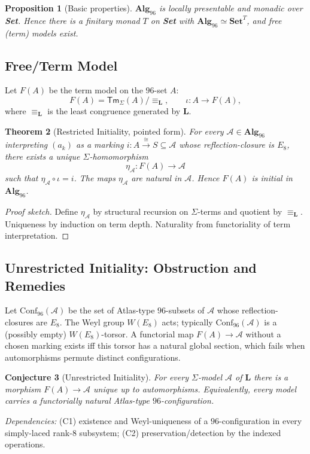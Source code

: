 \documentclass[12pt]{article}
\newtheorem{theorem}{Theorem}
\newtheorem{conjecture}[theorem]{Conjecture}
\newtheorem{proposition}[theorem]{Proposition}
\begin{document}
\begin{proposition}[Basic properties]
$\mathbf{Alg}_{96}$ is locally presentable and monadic over \textbf{Set}. Hence there is a finitary monad $T$ on \textbf{Set} with $\mathbf{Alg}_{96}\simeq \mathbf{Set}^T$, and free (term) models exist.
\end{proposition}

\subsection{Free/Term Model}
Let $F(A)$ be the term model on the $96$-set $A$:
\[
F(A)=\mathsf{Tm}_\Sigma(A)/{\equiv_{\mathbf L}},\qquad \iota:A\to F(A),
\]
where $\equiv_{\mathbf L}$ is the least congruence generated by $\mathbf L$.

\begin{theorem}[Restricted Initiality, pointed form]\label{thm:restricted-initiality}
For every $\mathcal A\in \mathbf{Alg}_{96}$ interpreting $(a_k)$ as a marking $i:A\xrightarrow{\cong} S\subseteq \mathcal A$ whose reflection-closure is $E_8$, there exists a unique $\Sigma$-homomorphism
\[
\eta_{\mathcal A}:F(A)\to \mathcal A
\]
such that $\eta_{\mathcal A}\circ\iota=i$. The maps $\eta_{\mathcal A}$ are natural in $\mathcal A$. Hence $F(A)$ is initial in $\mathbf{Alg}_{96}$.
\end{theorem}
\begin{proof}[Proof sketch]
Define $\eta_{\mathcal A}$ by structural recursion on $\Sigma$-terms and quotient by $\equiv_{\mathbf L}$. Uniqueness by induction on term depth. Naturality from functoriality of term interpretation.
\end{proof}

\subsection{Unrestricted Initiality: Obstruction and Remedies}
Let $\mathrm{Conf}_{96}(\mathcal A)$ be the set of Atlas-type $96$-subsets of $\mathcal A$ whose reflection-closures are $E_8$. The Weyl group $W(E_8)$ acts; typically $\mathrm{Conf}_{96}(\mathcal A)$ is a (possibly empty) $W(E_8)$-torsor. A functorial map $F(A)\to\mathcal A$ without a chosen marking exists iff this torsor has a natural global section, which fails when automorphisms permute distinct configurations.

\begin{conjecture}[Unrestricted Initiality]
For every $\Sigma$-model $\mathcal A$ of $\mathbf L$ there is a morphism $F(A)\to\mathcal A$ unique up to automorphisms. Equivalently, every model carries a functorially natural Atlas-type $96$-configuration.
\end{conjecture}
\noindent\emph{Dependencies:} (C1) existence and Weyl-uniqueness of a $96$-configuration in every simply-laced rank-$8$ subsystem; (C2) preservation/detection by the indexed operations.
\end{document}
